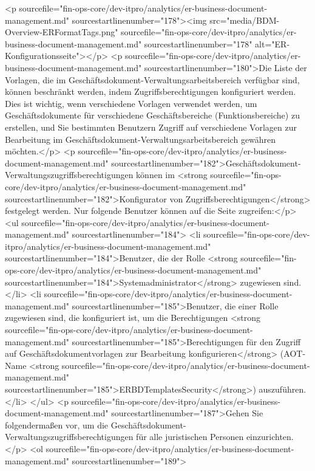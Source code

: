 <p sourcefile="fin-ops-core/dev-itpro/analytics/er-business-document-management.md" sourcestartlinenumber="178"><img src="media/BDM-Overview-ERFormatTags.png" sourcefile="fin-ops-core/dev-itpro/analytics/er-business-document-management.md" sourcestartlinenumber="178" alt="ER-Konfigurationsseite"></p>
<p sourcefile="fin-ops-core/dev-itpro/analytics/er-business-document-management.md" sourcestartlinenumber="180">Die Liste der Vorlagen, die im Geschäftsdokument-Verwaltungsarbeitsbereich verfügbar sind, können beschränkt werden, indem Zugriffsberechtigungen konfiguriert werden. Dies ist wichtig, wenn verschiedene Vorlagen verwendet werden, um Geschäftsdokumente für verschiedene Geschäftsbereiche (Funktionsbereiche) zu erstellen, und Sie bestimmten Benutzern Zugriff auf verschiedene Vorlagen zur Bearbeitung im Geschäftsdokument-Verwaltungsarbeitsbereich gewähren möchten.</p>
<p sourcefile="fin-ops-core/dev-itpro/analytics/er-business-document-management.md" sourcestartlinenumber="182">Geschäftsdokument-Verwaltungszugriffsberechtigungen können im <strong sourcefile="fin-ops-core/dev-itpro/analytics/er-business-document-management.md" sourcestartlinenumber="182">Konfigurator von Zugriffsberechtigungen</strong> festgelegt werden. Nur folgende Benutzer können auf die Seite zugreifen:</p>
<ul sourcefile="fin-ops-core/dev-itpro/analytics/er-business-document-management.md" sourcestartlinenumber="184">
<li sourcefile="fin-ops-core/dev-itpro/analytics/er-business-document-management.md" sourcestartlinenumber="184">Benutzer, die der Rolle <strong sourcefile="fin-ops-core/dev-itpro/analytics/er-business-document-management.md" sourcestartlinenumber="184">Systemadministrator</strong> zugewiesen sind.</li>
<li sourcefile="fin-ops-core/dev-itpro/analytics/er-business-document-management.md" sourcestartlinenumber="185">Benutzer, die einer Rolle zugewiesen sind, die konfiguriert ist, um die Berechtigungen <strong sourcefile="fin-ops-core/dev-itpro/analytics/er-business-document-management.md" sourcestartlinenumber="185">Berechtigungen für den Zugriff auf Geschäftsdokumentvorlagen zur Bearbeitung konfigurieren</strong> (AOT-Name <strong sourcefile="fin-ops-core/dev-itpro/analytics/er-business-document-management.md" sourcestartlinenumber="185">ERBDTemplatesSecurity</strong>) auszuführen.</li>
</ul>
<p sourcefile="fin-ops-core/dev-itpro/analytics/er-business-document-management.md" sourcestartlinenumber="187">Gehen Sie folgendermaßen vor, um die Geschäftsdokument-Verwaltungszugriffsberechtigungen für alle juristischen Personen einzurichten.</p>
<ol sourcefile="fin-ops-core/dev-itpro/analytics/er-business-document-management.md" sourcestartlinenumber="189">

